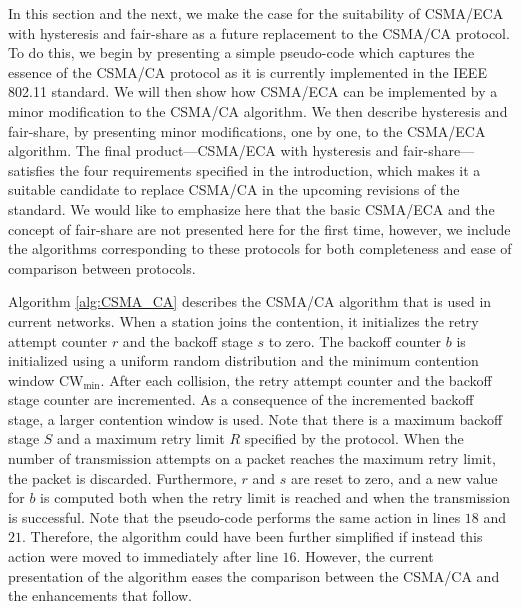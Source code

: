 \documentclass[conference]{IEEEtran}
\begin{document}
In this section and the next, we make the case for the suitability of CSMA/ECA with hysteresis and fair-share as a future replacement to the CSMA/CA protocol. To do this, we begin by presenting a simple pseudo-code which captures the essence of the CSMA/CA protocol as it is currently implemented in the IEEE 802.11 standard. We will then show how CSMA/ECA can be implemented by a minor modification to the CSMA/CA algorithm. We then describe hysteresis and fair-share, by presenting minor modifications, one by one, to the CSMA/ECA algorithm. The final product---CSMA/ECA with hysteresis and fair-share---satisfies the four requirements specified in the introduction, which makes it a suitable candidate to replace CSMA/CA in the upcoming revisions of the standard. We would like to emphasize here that the basic CSMA/ECA and the concept of fair-share are not presented here for the first time, however, we include the algorithms corresponding to these protocols for both completeness and ease of comparison between protocols.

Algorithm \ref{alg:CSMA_CA} describes the CSMA/CA algorithm that is used in current networks.
When a station joins the contention, it initializes the retry attempt counter $r$ and the backoff stage $s$ to zero. The backoff counter $b$ is initialized using a uniform random distribution and the minimum contention window $\text{CW}_{\min}$. After each collision, the retry attempt counter and the backoff stage counter are incremented. As a consequence of the incremented backoff stage, a larger contention window is used. Note that there is a maximum backoff stage $S$ and a maximum retry limit $R$ specified by the protocol. When the number of transmission attempts on a packet reaches the maximum retry limit, the packet is discarded. Furthermore, $r$ and $s$ are reset to zero, and a new value for $b$ is computed both when the retry limit is reached and when the transmission is successful. Note that the pseudo-code performs the same action in lines $18$ and $21$. Therefore, the algorithm could have been further simplified if instead this action were moved to immediately after line $16$. However, the current presentation of the algorithm eases the comparison between the CSMA/CA and the enhancements that follow.

% 
% 
\end{document}

